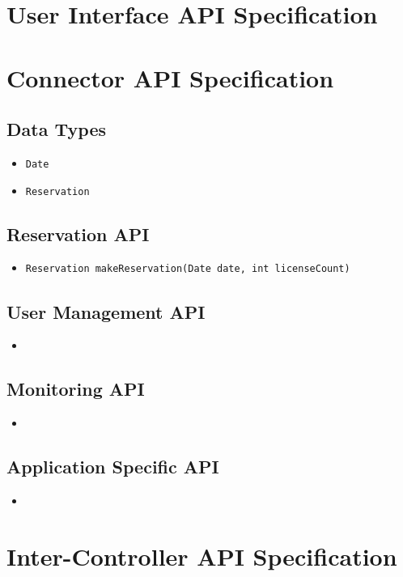 \documentclass[a4paper]{report}
\newcommand{\APIcmd}[1]{\item \texttt{#1}}
\newenvironment{APIdef}{\begin{itemize}}{\end{itemize}}
\begin{document}
\chapter{User Interface API Specification}

\chapter{Connector API Specification}

\section{Data Types}

\begin{APIdef}

\APIcmd{Date}

\APIcmd{Reservation}

\end{APIdef}


\section{Reservation API}

\begin{APIdef}

\APIcmd{Reservation makeReservation(Date date, int licenseCount)}

\end{APIdef}




\section{User Management API}

\begin{itemize}

\item

\end{itemize}


\section{Monitoring API}

\begin{itemize}

\item 

\end{itemize}


\section{Application Specific API}

\begin{itemize}

\item

\end{itemize}


\chapter{Inter-Controller API Specification}
\end{document}
